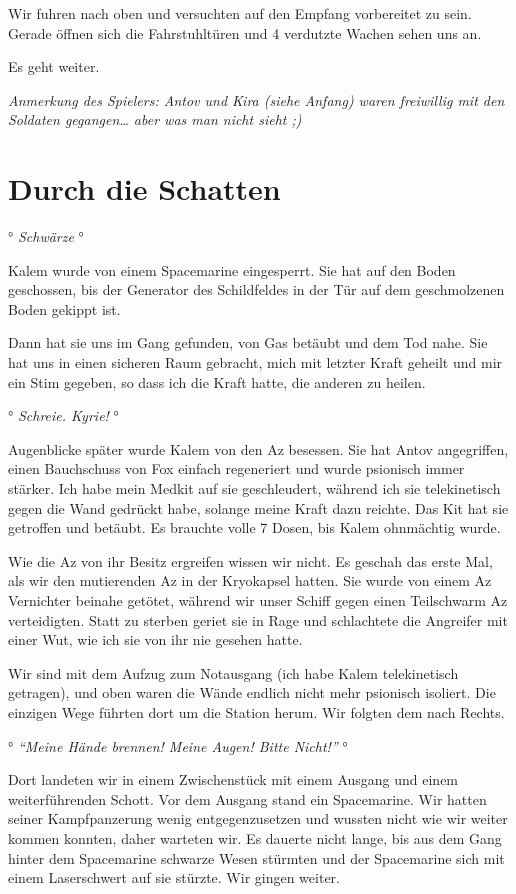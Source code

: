 \documentclass[11pt]{article}
\begin{document}
Wir fuhren nach oben und versuchten auf den Empfang vorbereitet zu sein.
Gerade öffnen sich die Fahrstuhltüren und 4 verdutzte Wachen sehen uns
an.

Es geht weiter.

\emph{Anmerkung des Spielers: Antov und Kira (siehe Anfang) waren
freiwillig mit den Soldaten gegangen\ldots{} aber was man nicht sieht
;)}

\section{Durch die Schatten}

° \emph{Schwärze} °

Kalem wurde von einem Spacemarine eingesperrt. Sie hat auf den Boden
geschossen, bis der Generator des Schildfeldes in der Tür auf dem
geschmolzenen Boden gekippt ist.

Dann hat sie uns im Gang gefunden, von Gas betäubt und dem Tod nahe. Sie
hat uns in einen sicheren Raum gebracht, mich mit letzter Kraft geheilt
und mir ein Stim gegeben, so dass ich die Kraft hatte, die anderen zu
heilen.

° \emph{Schreie. Kyrie!} °

Augenblicke später wurde Kalem von den Az besessen. Sie hat Antov
angegriffen, einen Bauchschuss von Fox einfach regeneriert und wurde
psionisch immer stärker. Ich habe mein Medkit auf sie geschleudert,
während ich sie telekinetisch gegen die Wand gedrückt habe, solange
meine Kraft dazu reichte. Das Kit hat sie getroffen und betäubt. Es
brauchte volle 7 Dosen, bis Kalem ohnmächtig wurde.

Wie die Az von ihr Besitz ergreifen wissen wir nicht. Es geschah das
erste Mal, als wir den mutierenden Az in der Kryokapsel hatten. Sie
wurde von einem Az Vernichter beinahe getötet, während wir unser Schiff
gegen einen Teilschwarm Az verteidigten. Statt zu sterben geriet sie in
Rage und schlachtete die Angreifer mit einer Wut, wie ich sie von ihr
nie gesehen hatte.

Wir sind mit dem Aufzug zum Notausgang (ich habe Kalem telekinetisch
getragen), und oben waren die Wände endlich nicht mehr psionisch
isoliert. Die einzigen Wege führten dort um die Station herum. Wir
folgten dem nach Rechts.

° \emph{``Meine Hände brennen! Meine Augen! Bitte Nicht!''} °

Dort landeten wir in einem Zwischenstück mit einem Ausgang und einem
weiterführenden Schott. Vor dem Ausgang stand ein Spacemarine. Wir
hatten seiner Kampfpanzerung wenig entgegenzusetzen und wussten nicht
wie wir weiter kommen konnten, daher warteten wir. Es dauerte nicht
lange, bis aus dem Gang hinter dem Spacemarine schwarze Wesen stürmten
und der Spacemarine sich mit einem Laserschwert auf sie stürzte. Wir
gingen weiter.
\end{document}
